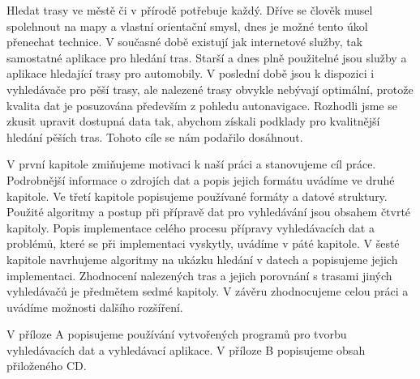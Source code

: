 
Hledat trasy ve městě či v přírodě potřebuje každý. Dříve se člověk musel
spolehnout na mapy a vlastní orientační smysl, dnes je možné tento úkol
přenechat technice. V současné době existují jak internetové služby, tak
samostatné aplikace pro hledání tras. Starší a dnes plně použitelné jsou služby a
aplikace hledající trasy pro automobily. V poslední době jsou k dispozici i
vyhledávače pro pěší trasy, ale nalezené trasy obvykle nebývají optimální,
protože kvalita dat je posuzována především z pohledu autonavigace. Rozhodli
jsme se zkusit upravit dostupná data tak, abychom získali podklady pro
kvalitnější hledání pěších tras. Tohoto cíle se nám podařilo dosáhnout. 

V první kapitole zmiňujeme motivaci k naší práci a stanovujeme cíl práce.
Podrobnější informace o zdrojích dat a popis jejich formátu uvádíme ve druhé
kapitole. Ve třetí kapitole popisujeme používané formáty a datové struktury.
Použité algoritmy a postup při přípravě dat pro vyhledávání jsou obsahem čtvrté
kapitoly. Popis implementace celého procesu přípravy vyhledávacích dat a
problémů, které se při implementaci vyskytly, uvádíme v páté kapitole. V šesté
kapitole navrhujeme algoritmy na ukázku hledání v datech a popisujeme jejich
implementaci. Zhodnocení nalezených tras a jejich porovnání s trasami jiných
vyhledávačů je předmětem sedmé kapitoly. V závěru zhodnocujeme celou práci a
uvádíme možnosti dalšího rozšíření.

V příloze A popisujeme používání vytvořených programů pro tvorbu vyhledávacích
dat a vyhledávací aplikace. V příloze B popisujeme obsah přiloženého CD.



